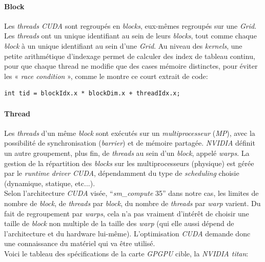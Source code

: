 \documentclass[french, 11pt]{memoir}
\begin{document}
\paragraph{Block}\label{block}
Les \emph{threads CUDA} sont regroupés en \emph{blocks}, eux-mêmes
regroupés sur une \emph{Grid}. Les \emph{threads} ont un unique
identifiant au sein de leurs \emph{blocks}, tout comme chaque
\emph{block} à un unique identifiant au sein d'une \emph{Grid}. Au
niveau des \emph{kernels}, une petite arithmétique d'indexage permet de
calculer des index de tableau continu, pour que chaque thread ne modifie
que des cases mémoire distinctes, pour éviter les « \emph{race condition
}», comme le montre ce court extrait de code:

\begin{verbatim}
int tid = blockIdx.x * blockDim.x + threadIdx.x;
\end{verbatim}


\paragraph{Thread}\label{thread}

Les \emph{threads} d'un même \emph{block} sont exécutés sur un
\emph{multiprocesseur} (\emph{MP}), avec la possibilité de
synchronisation (\emph{barrier}) et de mémoire partagée. \emph{NVIDIA}
définit un autre groupement, plus fin, de \emph{threads} au sein d'un
\emph{block}, appelé \textit{warps}. La gestion de la répartition des
\textit{blocks} sur les multiprocesseurs (physique) est gérée par le
\emph{runtime driver CUDA}, dépendamment du type de \emph{scheduling}
choisie (dynamique, statique, etc...). \\
Selon l'architecture \emph{CUDA}
visée, ``\emph{sm\_compute} 35'' dans notre cas, les limites de nombre
de \emph{block}, de \emph{threads} par \emph{block}, du nombre de
\emph{threads} par \emph{warp} varient. Du fait de regroupement par
\textit{warps}, cela n'a pas vraiment d'intérêt de choisir une taille de
\textit{block} non multiple de la taille des \emph{warp} (qui elle aussi dépend
de l'architecture et du hardware lui-même). L'optimisation \emph{CUDA}
demande donc une connaissance du matériel qui va être utilisé. \\
Voici le tableau des spécifications de la carte \textit{GPGPU} cible, la
\emph{NVIDIA titan}:
\end{document}
